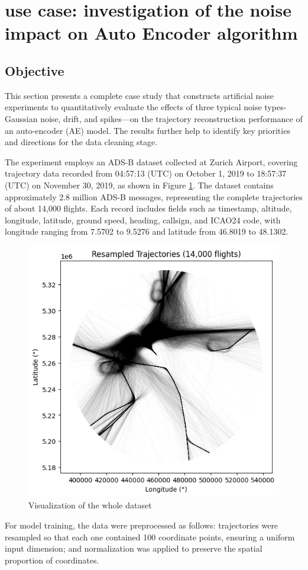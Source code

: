 \section{use case: investigation of the noise impact on Auto Encoder algorithm}\label{usecase}

\subsection{Objective}
This section presents a complete case study that constructs artificial noise experiments to quantitatively evaluate the effects of three typical noise types-Gaussian noise, drift, and spikes—on the trajectory reconstruction performance of an auto-encoder (AE) model. The results further help to identify key priorities and directions for the data cleaning stage.

The experiment employs an ADS-B dataset collected at Zurich Airport, covering trajectory data recorded from 04:57:13 (UTC) on October 1, 2019 to 18:57:37 (UTC) on November 30, 2019, as shown in Figure \ref{fig:totaltracks}. The dataset contains approximately 2.8 million ADS-B messages, representing the complete trajectories of about 14,000 flights. Each record includes fields such as timestamp, altitude, longitude, latitude, ground speed, heading, callsign, and ICAO24 code, with longitude ranging from 7.5702 to 9.5276 and latitude from 46.8019 to 48.1302.

\begin{figure}[h]
	\centering
	\includegraphics[width=0.5\linewidth]{totaltracks}
	\caption{Visualization of the whole dataset}
	\label{fig:totaltracks}
\end{figure}

For model training, the data were preprocessed as follows: trajectories were resampled so that each one contained 100 coordinate points, ensuring a uniform input dimension; and normalization was applied to preserve the spatial proportion of coordinates.

